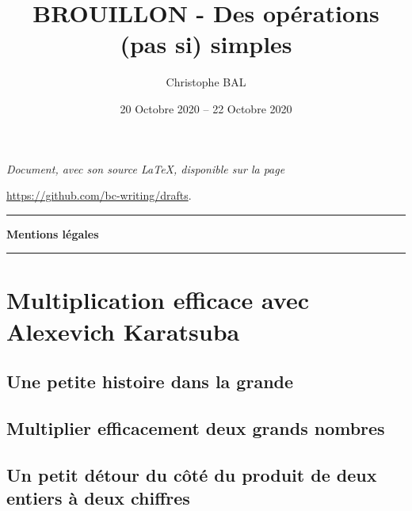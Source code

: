 \documentclass[12pt]{amsart}
\begin{document}
\title{BROUILLON - Des opérations (pas si) simples}
\author{Christophe BAL}
\date{20 Octobre 2020 -- 22 Octobre 2020}

\maketitle

\begin{center}
	\itshape
	Document, avec son source \LaTeX, disponible sur la page
	
	\url{https://github.com/bc-writing/drafts}.
\end{center}


\bigskip


\begin{center}
	\hrule\vspace{.3em}
	{
		\fontsize{1.35em}{1em}\selectfont
		\textbf{Mentions \og légales \fg}
	}
			
	\vspace{0.45em}
	\doclicenseThis
	\hrule
\end{center}


\bigskip
\setcounter{tocdepth}{2}
\tableofcontents




\newpage

\section{Multiplication efficace avec Alexevich Karatsuba}

	\subsection{Une petite histoire dans la grande}
	


	\subsection{Multiplier efficacement deux grands nombres}
	


	\subsection{Un petit détour du côté du produit de deux entiers à deux chiffres}
	
	
	
\end{document}

